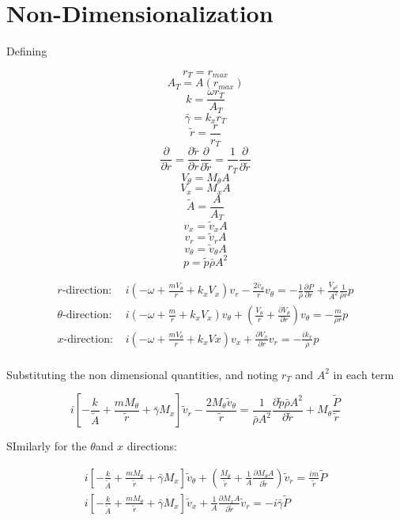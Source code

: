 \documentclass[12pt]{article}
\begin{document}
\section{Non-Dimensionalization}
Defining 

\[r_T = r_{max}\]
\[A_T = A(r_{max})\]
\[k = \frac{\omega r_T}{A_T}\]
\[\bar{\gamma} = k_x r_T\]
\[\tilde{r} = \frac{r}{r_T}\]
\[\frac{\partial }{\partial r} = \frac{\partial \tilde{r}}{\partial r} \frac{\partial }{\partial \tilde{r}} = \frac{1}{r_T} \frac{\partial }{\partial \tilde{r}}\]
\[V_{\theta} = M_{\theta} A\]
\[V_{x} = M_{x} A\]
\[\tilde{A} = \frac{A}{A_T}\]
\[v_{x} =\tilde{v}_x A\]
\[v_{r} =\tilde{v}_r A\]
\[v_{\theta} =\tilde{v}_{\theta} A\]
\[p = \tilde{p} \bar{\rho} A^2\]

\begin{align*}
r\text{-direction: }& i\left(-\omega + \frac{ m V_{\theta}}{r} +  k_x V_x \right) v_r - \frac{2 \bar{v}_{\theta}}{r}v_{\theta}  = -\frac{1}{\bar{\rho}} \frac{\partial P}{\partial r}+ \frac{V_{\theta^2}}{A^2}\frac{1}{\bar{\rho} r}p\\
\theta\text{-direction: }& i\left(-\omega + \frac{ m}{r} +  k_x V_x \right) v_{\theta} + \left(\frac{V_{\theta}}{r} +  \frac{\partial V_{\theta}}{\partial r}\right)v_\theta= -\frac{m}{\bar{\rho}r}p \\ 
x\text{-direction: } &i\left(-\omega + \frac{mV_{\theta}}{r} +  k_xVx\right)v_x + \frac{\partial V_x}{\partial r} v_r = - \frac{i
	k_x}{\bar{\rho}}p\\
\end{align*}

Substituting the non dimensional quantities, and noting $r_T$ and $A^2$ in each term

\[ i\left[ - \frac{k}{\tilde{A}} + \frac{m M_{\theta}}{\tilde{r}} + \bar{\gamma} M_x \right] \tilde{v}_r - \frac{2 M_{\theta} \tilde{v}_{\theta}}{\tilde{r}} = \frac{1}{\bar{\rho} A^2}\frac{\partial \tilde{p}\bar{\rho} A^2}{\partial \tilde{r}} + M_{\theta}\frac{\tilde{P}}{\tilde{r}}\]

SImilarly for the $\theta$and $x$ directions:

\begin{align*}
	 i\left[ - \frac{k}{\tilde{A}} + \frac{m M_{\theta}}{\tilde{r}} + \bar{\gamma} M_x \right] \tilde{v}_{\theta} + \left(\frac{ M_{\theta}}{\tilde{r}}  + \frac{1}{A} \frac{\partial M_{\theta}A}{\partial \tilde{r}}\right)\tilde{v}_r = \frac{i m}{\tilde{r}}\tilde{P}\\
	 i\left[ - \frac{k}{\tilde{A}} + \frac{m M_{\theta}}{\tilde{r}} + \bar{\gamma} M_x \right] \tilde{v}_x  + \frac{1}{A} \frac{\partial M_x A}{\partial \tilde{r}}\tilde{v}_r = -i \bar{\gamma}\tilde{P}
\end{align*}
\end{document}
